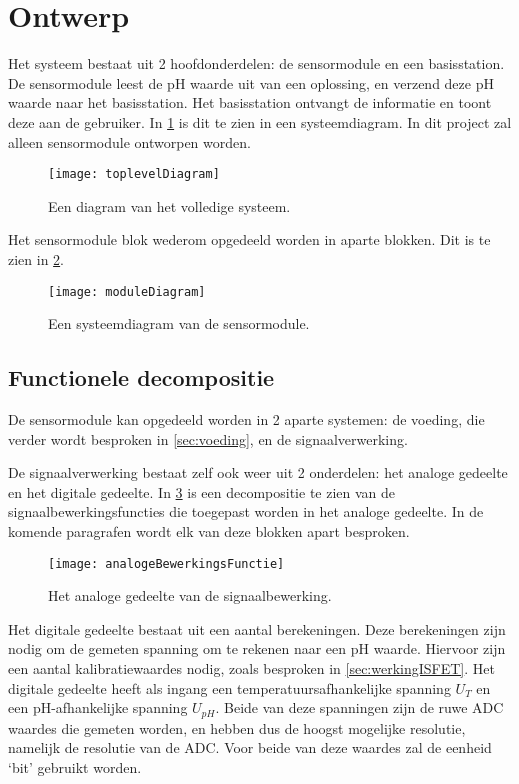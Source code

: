 \section{Ontwerp}
Het systeem bestaat uit 2 hoofdonderdelen: de sensormodule en een basisstation. De sensormodule leest de pH waarde uit van een oplossing, en verzend deze pH waarde naar het basisstation. Het basisstation ontvangt de informatie en toont deze aan de gebruiker.
In \cref{fig:functional} is dit te zien in een systeemdiagram.
In dit project zal alleen sensormodule ontworpen worden.

\begin{figure}[ht]
    \centering
    \texttt{[image: toplevelDiagram]}
    \caption[short]{Een diagram van het volledige systeem.}
    \label{fig:functional}
\end{figure}

Het sensormodule blok wederom opgedeeld worden in aparte blokken. Dit is te zien in \cref{fig:moduleDiagram}.

\begin{figure}[ht]
    \centering
    \texttt{[image: moduleDiagram]}
    \caption{Een systeemdiagram van de sensormodule.} 
    \label{fig:moduleDiagram}
\end{figure}

\subsection{Functionele decompositie}
De sensormodule kan opgedeeld worden in 2 aparte systemen: de voeding, die verder wordt besproken in \cref{sec:voeding}, en de signaalverwerking.

De signaalverwerking bestaat zelf ook weer uit 2 onderdelen: het analoge gedeelte en het digitale gedeelte. In \cref{fig:analogeBewerkingsFunctie} is een decompositie te zien van de signaalbewerkingsfuncties die toegepast worden in het analoge gedeelte. In de komende paragrafen wordt elk van deze blokken apart besproken.

\begin{figure}[ht]
    \centering
    \texttt{[image: analogeBewerkingsFunctie]}
    \caption{Het analoge gedeelte van de signaalbewerking.} 
    \label{fig:analogeBewerkingsFunctie}
\end{figure}


Het digitale gedeelte bestaat uit een aantal berekeningen. Deze berekeningen zijn nodig om de gemeten spanning om te rekenen naar een pH waarde. Hiervoor zijn een aantal kalibratiewaardes nodig, zoals besproken in \cref{sec:werkingISFET}. Het digitale gedeelte heeft als ingang een temperatuursafhankelijke spanning $U_T$ en een pH-afhankelijke spanning $U_{pH}$. Beide van deze spanningen zijn de ruwe ADC waardes die gemeten worden, en hebben dus de hoogst mogelijke resolutie, namelijk de resolutie van de ADC. Voor beide van deze waardes zal de eenheid `bit' gebruikt worden.

